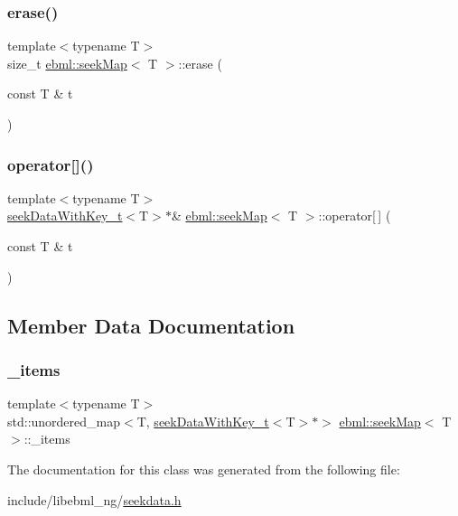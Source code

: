 \mbox{\label{classebml_1_1seekMap_aba83cd8b8a60bd460bfe78acf1d04616}} 
\subsubsection{\texorpdfstring{erase()}{erase()}}
{\footnotesize\ttfamily template$<$typename T$>$ \\
size\+\_\+t \mbox{\hyperlink{classebml_1_1seekMap}{ebml\+::seek\+Map}}$<$ T $>$\+::erase (\begin{DoxyParamCaption}\item[{const T \&}]{t }\end{DoxyParamCaption})}

\mbox{\label{classebml_1_1seekMap_ada2dfac4d3ed8f6046703a3385afc3d5}} 
\subsubsection{\texorpdfstring{operator[]()}{operator[]()}}
{\footnotesize\ttfamily template$<$typename T$>$ \\
\mbox{\hyperlink{classebml_1_1seekDataWithKey__t}{seek\+Data\+With\+Key\+\_\+t}}$<$T$>$$\ast$\& \mbox{\hyperlink{classebml_1_1seekMap}{ebml\+::seek\+Map}}$<$ T $>$\+::operator\mbox{[}$\,$\mbox{]} (\begin{DoxyParamCaption}\item[{const T \&}]{t }\end{DoxyParamCaption})}



\subsection{Member Data Documentation}
\mbox{\label{classebml_1_1seekMap_aa2314daf708d3b18ab5cf5d64afb3253}} 
\subsubsection{\texorpdfstring{\+\_\+items}{\_items}}
{\footnotesize\ttfamily template$<$typename T$>$ \\
std\+::unordered\+\_\+map$<$T, \mbox{\hyperlink{classebml_1_1seekDataWithKey__t}{seek\+Data\+With\+Key\+\_\+t}}$<$T$>$$\ast$$>$ \mbox{\hyperlink{classebml_1_1seekMap}{ebml\+::seek\+Map}}$<$ T $>$\+::\+\_\+items\hspace{0.3cm}{\ttfamily [protected]}}



The documentation for this class was generated from the following file\+:\begin{DoxyCompactItemize}
\item 
include/libebml\+\_\+ng/\mbox{\hyperlink{seekdata_8h}{seekdata.\+h}}\end{DoxyCompactItemize}
